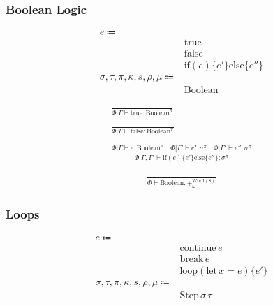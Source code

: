 \documentclass {article}
\begin{document}
\subsubsection{Boolean Logic}
\begin{align*}
e \Coloneqq & \\
& \text{true} \\
& \text{false} \\
& \text{if} (e) \{ e' \} \text{else} \{ e'' \} \\
\sigma, \tau, \pi, \kappa, s, \rho, \mu \Coloneqq & \\
& \text{Boolean}
\end{align*}

\begin{gather*}
\frac
{}
{ \Phi | \Gamma \vdash \text{true} : \text{Boolean}^\pi} \\
\\
\frac
{}
{ \Phi | \Gamma \vdash \text{false} : \text{Boolean}^\pi} \\
\\
\frac
{\Phi | \Gamma \vdash e : \text{Boolean}^\pi \quad \Phi | \Gamma' \vdash e' : \sigma^\pi \quad \Phi | \Gamma' \vdash e'' : \sigma^\pi }
{\Phi | \Gamma, \Gamma' \vdash \text{if} (e) \{ e' \} \text{else} \{ e'' \} : \sigma^\pi }
\end{gather*}

\begin{gather*}
\frac
{}
{ \Phi \vdash \text{Boolean} : +^{\text{Word}(8)}_\omega}
\end{gather*}

\subsubsection{Loops}
\begin{align*}
e \Coloneqq & \\
& \text{continue} \, e \tag{continue} \\
& \text{break} \, e \tag{break} \\
& \text{loop} (\text{let} \, x = e) \{ e' \} \tag{loop} \\
\sigma, \tau, \pi, \kappa, s, \rho, \mu \Coloneqq & \\
& \text{Step} \, \sigma \, \tau \tag{Loop Instruction}
\end{align*}
\end{document}
